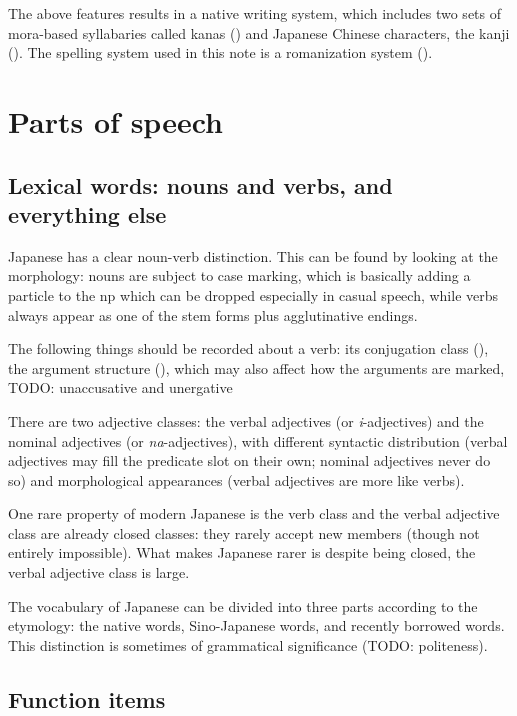 \documentclass[UTF8, a4paper, oneside, scheme=plain]{ctexrep}
\newcommand{\corpus}[1]{\emph{#1}}
\begin{document}
The above features results in a native writing system,
which includes two sets of mora-based syllabaries called kanas ()
and Japanese Chinese characters, the kanji ().
The spelling system used in this note is a romanization system ().

\section{Parts of speech}

\subsection{Lexical words: nouns and verbs, and everything else}

Japanese has a clear noun-verb distinction.
This can be found by looking at the morphology:
nouns are subject to case marking,
which is basically adding a particle to the \acs{np} 
which can be dropped especially in casual speech,
while verbs always appear as one of the stem forms plus agglutinative endings.

The following things should be recorded about a verb:
its conjugation class (),
the argument structure (),
which may also affect how the arguments are marked,
TODO: unaccusative and unergative

There are two adjective classes:
the verbal adjectives (or \corpus{i}-adjectives)
and the nominal adjectives (or \corpus{na}-adjectives),
with different syntactic distribution 
(verbal adjectives may fill the predicate slot on their own; nominal adjectives never do so)
and morphological appearances
(verbal adjectives are more like verbs).

One rare property of modern Japanese is the verb class and the verbal adjective class 
are already closed classes:
they rarely accept new members (though not entirely impossible).
What makes Japanese rarer is despite being closed,
the verbal adjective class is large.

The vocabulary of Japanese can be divided into three parts according to the etymology:
the native words,
Sino-Japanese words,
and recently borrowed words.
This distinction is sometimes of grammatical significance (TODO: politeness).

\subsection{Function items}
\end{document}
